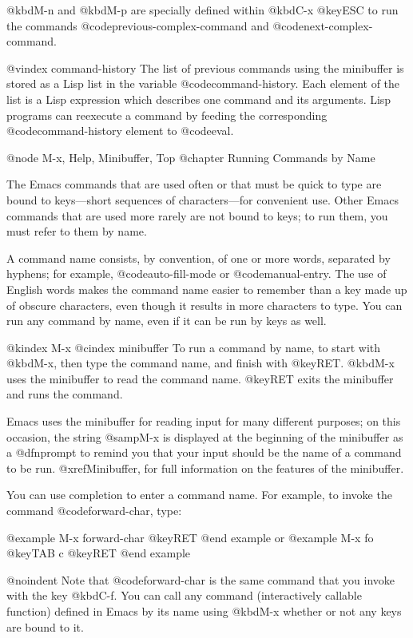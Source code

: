 {{@kbd{M-n} and @kbd{M-p} are specially defined within @kbd{C-x @key{ESC}}
to run the commands @code{previous-complex-command} and
@code{next-complex-command}.

@vindex command-history
  The list of previous commands using the minibuffer is stored as a Lisp
list in the variable @code{command-history}.  Each element of the list
is a Lisp expression which describes one command and its arguments.
Lisp programs can reexecute a command by feeding the corresponding
@code{command-history} element to @code{eval}.

@node M-x, Help, Minibuffer, Top
@chapter Running Commands by Name

  The Emacs commands that are used often or that must be quick to type are
bound to keys---short sequences of characters---for convenient use.  Other
Emacs commands that are used more rarely are not bound to keys; to run
them, you must refer to them by name.

  A command name consists, by convention, of one or more words,
separated by hyphens; for example, @code{auto-fill-mode} or
@code{manual-entry}.  The use of English words makes the command name
easier to remember than a key made up of obscure characters, even though
it results in more characters to type.  You can run any command by name,
even if it can be run by keys as well. 

@kindex M-x
@cindex minibuffer
 To run a command by name, to start with @kbd{M-x}, then type the
command name, and finish with @key{RET}.  @kbd{M-x} uses the minibuffer
to read the command name.  @key{RET} exits the minibuffer and runs the
command.

  Emacs uses the minibuffer for reading input for many different purposes;
on this occasion, the string @samp{M-x} is displayed at the beginning of
the minibuffer as a @dfn{prompt} to remind you that your input should be
the name of a command to be run.  @xref{Minibuffer}, for full information
on the features of the minibuffer.

  You can use completion to enter a command name.  For example, to
invoke the command @code{forward-char}, type:

@example
M-x forward-char @key{RET}
@end example
or
@example
M-x fo @key{TAB} c @key{RET}
@end example

@noindent
Note that @code{forward-char} is the same command that you invoke with
the key @kbd{C-f}.  You can call any command (interactively callable
function) defined in Emacs by its name using @kbd{M-x} whether or not
any keys are bound to it.

}}
